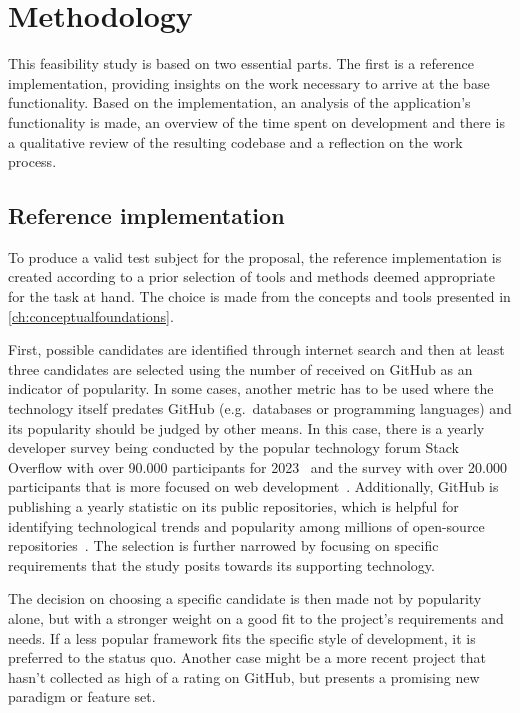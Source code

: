 \chapter{Methodology}
\label{ch:methodology}

This feasibility study is based on two essential parts.
The first is a reference implementation, providing insights on the work necessary to arrive at the base functionality.
Based on the implementation, an analysis of the application's functionality is made, an overview of the time spent on development and there is a qualitative review of the resulting codebase and a reflection on the work process.


\section{Reference implementation}
\label{sec:reference-implementation}

To produce a valid test subject for the proposal, the reference implementation is created according to a prior selection of tools and methods deemed appropriate for the task at hand.
The choice is made from the concepts and tools presented in \autoref{ch:conceptualfoundations}.

First, possible candidates are identified through internet search and then at least three candidates are selected using the number of  received on GitHub as an indicator of popularity.
In some cases, another metric has to be used where the technology itself predates GitHub (e.g.\ databases or programming languages) and its popularity should be judged by other means.
In this case, there is a yearly developer survey being conducted by the popular technology forum Stack Overflow with over 90.000 participants for 2023~\parencite{stackOverflowPoll} and the  survey with over 20.000 participants that is more focused on web development~\parencite{stateOfJSSurvey}.
Additionally, GitHub is publishing a yearly statistic on its public repositories, which is helpful for identifying technological trends and popularity among millions of open-source repositories~\parencite{stateOfTheOctoverse23}.
The selection is further narrowed by focusing on specific requirements that the study posits towards its supporting technology.

The decision on choosing a specific candidate is then made not by popularity alone, but with a stronger weight on a good fit to the project's requirements and needs.
If a less popular framework fits the specific style of development, it is preferred to the status quo.
Another case might be a more recent project that hasn't collected as high of a rating on GitHub, but presents a promising new paradigm or feature set.

